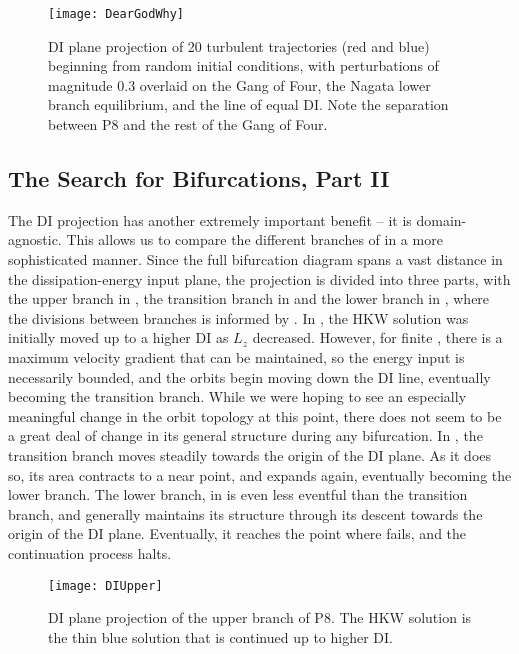 \begin{figure}[h]
\texttt{[image: DearGodWhy]}
\caption{DI plane projection of 20 turbulent trajectories (red and blue) beginning from random initial conditions, with perturbations of magnitude $0.3$ overlaid on the Gang of Four, the Nagata lower branch equilibrium, and the line of equal DI. Note the separation between P8 and the rest of the Gang of Four.}\label{fig:turbDI}
\end{figure}

\subsection{The Search for Bifurcations, Part II}
The DI projection has another extremely important benefit -- it is domain-agnostic. This allows us to compare the different branches of  in a more sophisticated manner. Since the full bifurcation diagram spans a vast distance in the dissipation-energy input plane, the projection is divided into three parts, with the upper branch in , the transition branch in  and the lower branch in , where the divisions between branches is informed by . In , the HKW solution was initially moved up to a higher DI as $L_z$ decreased. However, for finite \ReN, there is a maximum velocity gradient that can be maintained, so the energy input is necessarily bounded, and the orbits begin moving down the DI line, eventually becoming the transition branch. While we were hoping to see an especially meaningful change in the orbit topology at this point, there does not seem to be a great deal of change in its general structure during any bifurcation. In , the transition branch moves steadily towards the origin of the DI plane. As it does so, its area contracts to a near point, and expands again, eventually becoming the lower branch. The lower branch, in  is even less eventful than the transition branch, and generally maintains its structure through its descent towards the origin of the DI plane. Eventually, it reaches the point where  fails, and the continuation process halts.\\
 

\begin{figure}[h]
\texttt{[image: DIUpper]}
\caption{DI plane projection of the upper branch of P8. The HKW solution is the thin blue solution that is continued up to higher DI.}\label{fig:DIUpper}
\end{figure}


